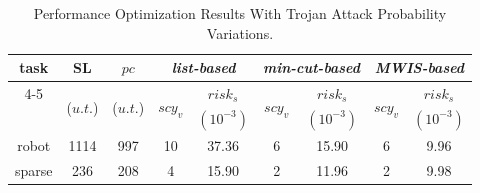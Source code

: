 \documentclass[10pt,journal]{IEEEtran}
\begin{document}
\begin{table}[!t]
\renewcommand{\arraystretch}{1.1}
\caption{Performance Optimization Results With Trojan Attack Probability Variations.}
\centering
\begin{tabular}{c|c|c|c|c|c|c|c|c}
\hline
\hline
\multirow{2}{*}{task}                            &\multirow{2}{*}{SL}            &\multirow{2}{*}{$pc$}        & \multicolumn{2}{c|}{\textit{list-based}}        &\multicolumn{2}{c|}{\textit{min-cut-based}}   &\multicolumn{2}{c}{\textit{MWIS-based}}        \\  \cline{4-5} \cline{6-7} \cline{8-9}
\multirow{2}{*}{graph}                                                   &\multirow{2}{*}{\hspace*{-1em}($u.t.$)\hspace*{-1em}}          &\multirow{2}{*}{($u.t.$)}       &\multirow{2}{*}{\hspace*{-0.6em}$scy_v$\hspace*{-0.6em}}     & \hspace*{-0.6em}$risk_s$\hspace*{-0.6em}  &\multirow{2}{*}{\hspace*{-0.6em}$scy_v$\hspace*{-0.6em}}     &\hspace*{-0.6em}$risk_s$\hspace*{-0.6em}   &\multirow{2}{*}{\hspace*{-0.6em}$scy_v$\hspace*{-0.6em}}     &\hspace*{-0.6em}$risk_s$\hspace*{-0.6em}   \\
    &         &       &     & \hspace*{-0.6em}$(10^{-3})$\hspace*{-0.6em}  &     &\hspace*{-0.6em}$(10^{-3})$\hspace*{-0.6em}   &     &\hspace*{-0.6em}$(10^{-3})$\hspace*{-0.6em}   \\

\hline
\hline

robot               &1114      &997  &10     &37.36   &6   &15.90   &6   &9.96     \\


sparse             &236        &208  &4  &15.90   &2   &11.96    &2   &9.98   \\



\end{tabular}
\end{table}
\end{document}
